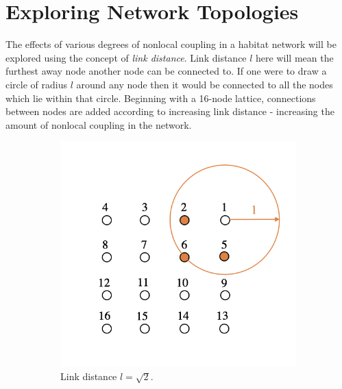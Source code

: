 \documentclass[12pt]{article}
\begin{document}
\section{Exploring Network Topologies}\label{section:network topologies}
The effects of various degrees of nonlocal coupling in a habitat network will be explored using the concept of \textit{link distance}. Link distance $l$ here will mean the furthest away node another node can be connected to. If one were to draw a circle of radius $l$ around any node then it would be connected to all the nodes which lie within that circle. Beginning with a 16-node lattice, connections between nodes are added according to increasing link distance - increasing the amount of nonlocal coupling in the network.
\begin{figure}[h]
    \centering
    \begin{subfigure}[b]{0.4\linewidth}
    \centering
    \includegraphics[width=\textwidth]{Xinzhu Section/link_dis_1.png}
    \caption{Link distance $l=\sqrt{2}$.}
    \end{subfigure}
    \hfill
    \begin{subfigure}[b]{0.4\linewidth}
    \centering

\end{subfigure}
\end{figure}
\end{document}
